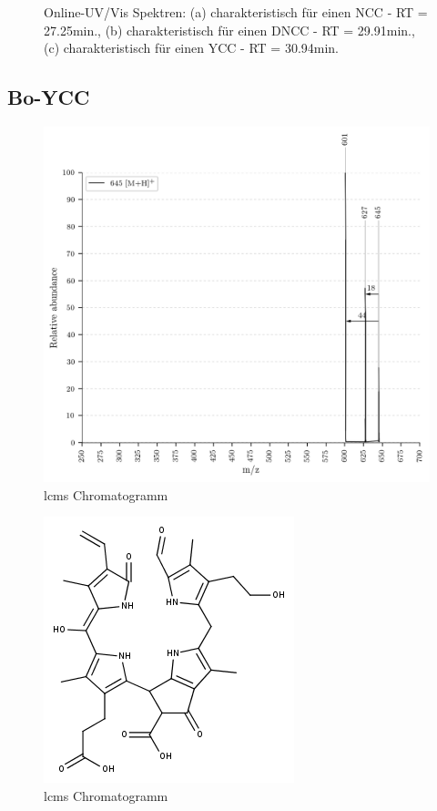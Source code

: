 \begin{figure}[!htbp]
\begin{subfigure}[b]{0.5\textwidth}
    \caption{}
    \label{fig:DNCC2991}
  \end{subfigure}
  \caption[Online-UV/Vis Spektren mit der Charakteristik eines NCC bei 27.10min., eines DNCC bei 29.75min. sowie eines YCC bei 30.94min., Quelle: Autor]{Online-UV/Vis Spektren: (a) charakteristisch für einen \gls{NCC} - RT = 27.25min., (b) charakteristisch für einen \gls{DNCC} - RT = 29.91min., (c) charakteristisch für einen \gls{YCC} - RT = 30.94min.}
\end{figure}

\subsection{Bo-YCC}

\begin{figure}[!htbp]
  \centering
  \includegraphics[width=\textwidth, height=0.7\textwidth]{figures/Kapitel7/Kataboliten/VWA_MS_645-1.png}
  \caption[LC-MS Chromatogramm vor der Reaktion, Quelle: Author]{\gls{lcms} Chromatogramm}
  \label{fig:LCMSChromatogramm}
\end{figure}

\begin{figure}[!htbp]
  \centering
  \includegraphics[scale=0.6]{figures/Kapitel7/Kataboliten/fragmentation_structures/VWA_Katabolit_645_vorReaktion.png}
  \caption[LC-MS Chromatogramm vor der Reaktion, Quelle: Author]{\gls{lcms} Chromatogramm}
  \label{fig:LCMSChromatogramm}
\end{figure}

